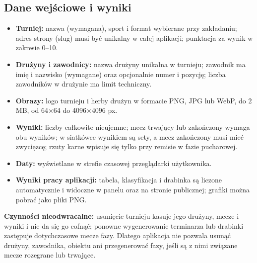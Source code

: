 \documentclass[11pt,a4paper,oneside]{article}
\newif\ifpodpowiedzi
\newcommand{\podpowiedz}[1]{\ifpodpowiedzi\par\begingroup\small\color{hintcolor}\textit{Wskazówka: #1}\par\endgroup\fi}
\begin{document}
\subsection{Dane wejściowe i wyniki}
\podpowiedz{Jeśli dotyczy: opisz obsługiwane formaty, wymagane pola, dopuszczalne wartości i ograniczenia danych. Wyjaśnij zapis, eksport, odtwarzanie lub interpretację wyników. Wskaż czynności mogące nadpisać lub usunąć dane. Dla animacji możesz opisać formaty plików wynikowych i parametry odtwarzania.}
\begin{itemize}
\item \textbf{Turniej:} nazwa (wymagana), sport i format wybierane przy zakładaniu; adres strony (slug) musi być unikalny w całej aplikacji; punktacja za wynik w zakresie 0--10.
\item \textbf{Drużyny i zawodnicy:} nazwa drużyny unikalna w turnieju; zawodnik ma imię i nazwisko (wymagane) oraz opcjonalnie numer i pozycję; liczba zawodników w drużynie ma limit techniczny.
\item \textbf{Obrazy:} logo turnieju i herby drużyn w formacie PNG, JPG lub WebP, do 2 MB, od 64$\times$64 do 4096$\times$4096 px.
\item \textbf{Wyniki:} liczby całkowite nieujemne; mecz trwający lub zakończony wymaga obu wyników; w siatkówce wynikiem są sety, a mecz zakończony musi mieć zwycięzcę; rzuty karne wpisuje się tylko przy remisie w fazie pucharowej.
\item \textbf{Daty:} wyświetlane w strefie czasowej przeglądarki użytkownika.
\item \textbf{Wyniki pracy aplikacji:} tabela, klasyfikacja i drabinka są liczone automatycznie i widoczne w panelu oraz na stronie publicznej; grafiki można pobrać jako pliki PNG.
\end{itemize}
\textbf{Czynności nieodwracalne:} usunięcie turnieju kasuje jego drużyny, mecze i wyniki i nie da się go cofnąć; ponowne wygenerowanie terminarza lub drabinki zastępuje dotychczasowe mecze fazy. Dlatego aplikacja nie pozwala usunąć drużyny, zawodnika, obiektu ani przegenerować fazy, jeśli są z nimi związane mecze rozegrane lub trwające.
\end{document}
